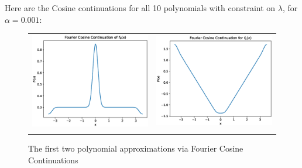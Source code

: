 \documentclass[11pt]{amsart}
\begin{document}
Here are the Cosine continuations for all 10 polynomials with constraint on $\lambda$, for $\alpha =0.001$:  
\begin{figure}[h!]
\centering
\begin{tabular}{|c|c|}
\hline
\includegraphics[scale=.5]{f_0Cosine.eps}
 \label{fig:Fig2}
&
\includegraphics[scale=.5]{f_1Cosine.eps}
\label{fig:Fig3}
\\ \\
\hline


\end{tabular}
\caption{The first two polynomial approximations via Fourier Cosine Continuations}
\end{figure}
\end{document}
